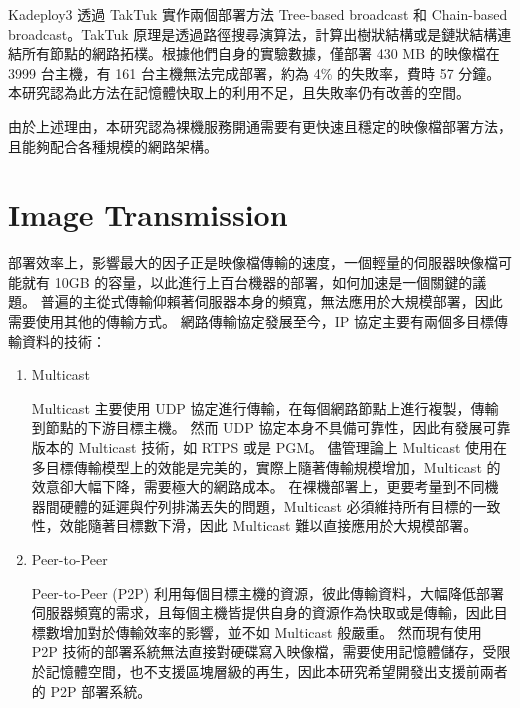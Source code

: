 Kadeploy3 透過 TakTuk 實作兩個部署方法 Tree-based broadcast 和 Chain-based broadcast。TakTuk 原理是透過路徑搜尋演算法，計算出樹狀結構或是鏈狀結構連結所有節點的網路拓樸。根據他們自身的實驗數據\cite{sarzyniec2012scalability}，僅部署 430 MB 的映像檔在 3999 台主機，有 161 台主機無法完成部署，約為 4\% 的失敗率，費時 57 分鐘。本研究認為此方法在記憶體快取上的利用不足，且失敗率仍有改善的空間。


由於上述理由，本研究認為裸機服務開通需要有更快速且穩定的映像檔部署方法，且能夠配合各種規模的網路架構。

\section{Image Transmission}
部署效率上，影響最大的因子正是映像檔傳輸的速度，一個輕量的伺服器映像檔可能就有 10GB 的容量，以此進行上百台機器的部署，如何加速是一個關鍵的議題。
普遍的主從式傳輸仰賴著伺服器本身的頻寬，無法應用於大規模部署，因此需要使用其他的傳輸方式。
網路傳輸協定發展至今，IP 協定主要有兩個多目標傳輸資料的技術：

\begin{enumerate}
\item Multicast

Multicast 主要使用 UDP 協定進行傳輸，在每個網路節點上進行複製，傳輸到節點的下游目標主機。
然而 UDP 協定本身不具備可靠性，因此有發展可靠版本的 Multicast 技術，如 RTPS 或是 PGM。
儘管理論上 Multicast 使用在多目標傳輸模型上的效能是完美的，實際上隨著傳輸規模增加，Multicast 的效意卻大幅下降，需要極大的網路成本。
在裸機部署上，更要考量到不同機器間硬體的延遲與佇列排滿丟失的問題，Multicast 必須維持所有目標的一致性，效能隨著目標數下滑，因此 Multicast 難以直接應用於大規模部署。
\item Peer-to-Peer

Peer-to-Peer (P2P) 利用每個目標主機的資源，彼此傳輸資料，大幅降低部署伺服器頻寬的需求，且每個主機皆提供自身的資源作為快取或是傳輸，因此目標數增加對於傳輸效率的影響，並不如 Multicast 般嚴重。
然而現有使用 P2P 技術的部署系統無法直接對硬碟寫入映像檔，需要使用記憶體儲存，受限於記憶體空間，也不支援區塊層級的再生，因此本研究希望開發出支援前兩者的 P2P 部署系統。
\end{enumerate}


